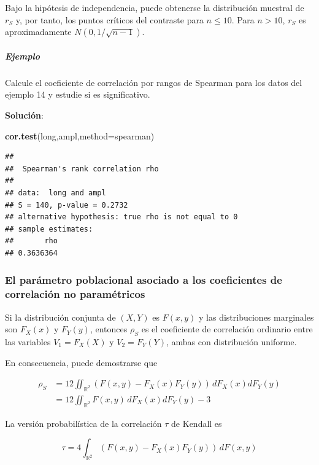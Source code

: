 \documentclass[
]{article}
\newenvironment{Shaded}{\begin{snugshade}}{\end{snugshade}}
\newcommand{\AttributeTok}[1]{\textcolor[rgb]{0.13,0.29,0.53}{#1}}
\newcommand{\FunctionTok}[1]{\textcolor[rgb]{0.13,0.29,0.53}{\textbf{#1}}}
\newcommand{\NormalTok}[1]{#1}
\newcommand{\StringTok}[1]{\textcolor[rgb]{0.31,0.60,0.02}{#1}}
\begin{document}
Bajo la hipótesis de independencia, puede obtenerse la distribución muestral de \(r_{S}\) y, por tanto, los puntos críticos del contraste para \(n\leq10\). Para \(n>10\), \(r_{S}\) es aproximadamente \(N(0,1/\sqrt{n-1})\).

\subparagraph{Ejemplo}\label{ejemplo-11}

Calcule el coeficiente de correlación por rangos de Spearman para los datos del ejemplo 14 y estudie si es significativo.

\textbf{Solución}:

\begin{Shaded}
\begin{Highlighting}[]
\FunctionTok{cor.test}\NormalTok{(long,ampl,}\AttributeTok{method=}\StringTok{\textquotesingle{}spearman\textquotesingle{}}\NormalTok{)}
\end{Highlighting}
\end{Shaded}

\begin{verbatim}
## 
##  Spearman's rank correlation rho
## 
## data:  long and ampl
## S = 140, p-value = 0.2732
## alternative hypothesis: true rho is not equal to 0
## sample estimates:
##       rho 
## 0.3636364
\end{verbatim}

\subsubsection{El parámetro poblacional asociado a los coeficientes de correlación no paramétricos}\label{el-paruxe1metro-poblacional-asociado-a-los-coeficientes-de-correlaciuxf3n-no-paramuxe9tricos}

Si la distribución conjunta de \((X,Y)\) es \(F(x,y)\) y las distribuciones marginales son \(F_X(x)\) y \(F_Y(y)\), entonces \(\rho_S\) es el coeficiente de correlación ordinario entre las variables \(V_1=F_X(X)\) y \(V_2=F_Y(Y)\), ambas con distribución uniforme.

En consecuencia, puede demostrarse que

\[
\begin{aligned}
\rho_S &=12\iint_{\mathbb R^2}(F(x,y)-F_X(x)F_Y(y))\,dF_X(x)dF_Y(y)\\
&=12\iint_{\mathbb R^2}F(x,y)\,dF_X(x)dF_Y(y)-3
\end{aligned}
\]

La versión probabilística de la correlación \(\tau\) de Kendall es

\[
\tau=4\int_{\mathbb R^2}(F(x,y)-F_X(x)F_Y(y))\,dF(x,y)
\]
\end{document}
